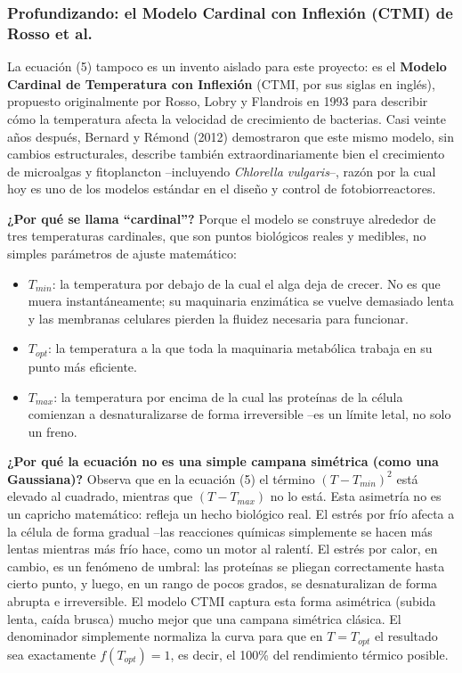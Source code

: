 \documentclass[11pt,a4paper]{article}
\begin{document}
\subsubsection{Profundizando: el Modelo Cardinal con Inflexión (CTMI) de Rosso et al.}
La ecuación (5) tampoco es un invento aislado para este proyecto: es el \textbf{Modelo Cardinal de Temperatura con Inflexión} (CTMI, por sus siglas en inglés), propuesto originalmente por Rosso, Lobry y Flandrois en 1993 para describir cómo la temperatura afecta la velocidad de crecimiento de bacterias. Casi veinte años después, Bernard y Rémond (2012) demostraron que este mismo modelo, sin cambios estructurales, describe también extraordinariamente bien el crecimiento de microalgas y fitoplancton --incluyendo \textit{Chlorella vulgaris}--, razón por la cual hoy es uno de los modelos estándar en el diseño y control de fotobiorreactores.

\textbf{¿Por qué se llama ``cardinal''?} Porque el modelo se construye alrededor de tres temperaturas cardinales, que son puntos biológicos reales y medibles, no simples parámetros de ajuste matemático:
\begin{itemize}
    \item $T_{min}$: la temperatura por debajo de la cual el alga deja de crecer. No es que muera instantáneamente; su maquinaria enzimática se vuelve demasiado lenta y las membranas celulares pierden la fluidez necesaria para funcionar.
    \item $T_{opt}$: la temperatura a la que toda la maquinaria metabólica trabaja en su punto más eficiente.
    \item $T_{max}$: la temperatura por encima de la cual las proteínas de la célula comienzan a desnaturalizarse de forma irreversible --es un límite letal, no solo un freno.
\end{itemize}

\textbf{¿Por qué la ecuación no es una simple campana simétrica (como una Gaussiana)?} Observa que en la ecuación (5) el término $(T-T_{min})^2$ está elevado al cuadrado, mientras que $(T-T_{max})$ no lo está. Esta asimetría no es un capricho matemático: refleja un hecho biológico real. El estrés por frío afecta a la célula de forma gradual --las reacciones químicas simplemente se hacen más lentas mientras más frío hace, como un motor al ralentí. El estrés por calor, en cambio, es un fenómeno de umbral: las proteínas se pliegan correctamente hasta cierto punto, y luego, en un rango de pocos grados, se desnaturalizan de forma abrupta e irreversible. El modelo CTMI captura esta forma asimétrica (subida lenta, caída brusca) mucho mejor que una campana simétrica clásica. El denominador simplemente normaliza la curva para que en $T=T_{opt}$ el resultado sea exactamente $f(T_{opt})=1$, es decir, el 100\% del rendimiento térmico posible.
\end{document}

